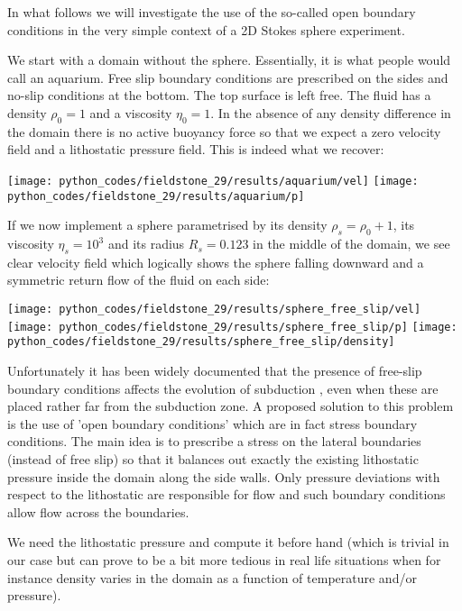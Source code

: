 In what follows we will investigate the use of the so-called open boundary conditions in 
the very simple context of a 2D Stokes sphere experiment. 


We start with a domain without the sphere. Essentially, it is what people would 
call an aquarium.
Free slip boundary conditions are prescribed on the sides and no-slip conditions at the bottom. 
The top surface is left free. The fluid has a density $\rho_0=1$ and a viscosity $\eta_0=1$.
In the absence of any density difference in the domain there is no active buoyancy force
so that we expect a zero velocity field and a lithostatic pressure field. 
This is indeed what we recover:  

\begin{center}
\texttt{[image: python\_codes/fieldstone\_29/results/aquarium/vel]}
\texttt{[image: python\_codes/fieldstone\_29/results/aquarium/p]}
\end{center}

If we now implement a sphere parametrised by its density $\rho_s=\rho_0+1$, its 
viscosity $\eta_s=10^3$ and its radius $R_s=0.123$ in the middle of the domain,  
we see clear velocity field which logically shows the sphere falling downward and 
a symmetric return flow of the fluid on each side:

\begin{center}
\texttt{[image: python\_codes/fieldstone\_29/results/sphere\_free\_slip/vel]}
\texttt{[image: python\_codes/fieldstone\_29/results/sphere\_free\_slip/p]}
\texttt{[image: python\_codes/fieldstone\_29/results/sphere\_free\_slip/density]}
\end{center}

Unfortunately it has been widely documented that the presence of free-slip 
boundary conditions affects the evolution of subduction \cite{chgv12}, 
even when these are placed rather far from the subduction zone. 
A proposed solution to this problem is the use of 'open boundary conditions'
which are in fact stress boundary conditions. 
The main idea is to prescribe a stress on the lateral boundaries (instead of free slip)
so that it balances out exactly the existing lithostatic pressure inside the domain 
along the side walls. Only pressure deviations with respect to the 
lithostatic are responsible for flow and such boundary conditions allow flow  
across the boundaries.

We need the lithostatic pressure and compute it before hand (which is trivial in 
our case but can prove to be a bit more tedious in real life situations when for instance
density varies in the domain as a function of temperature and/or pressure).

